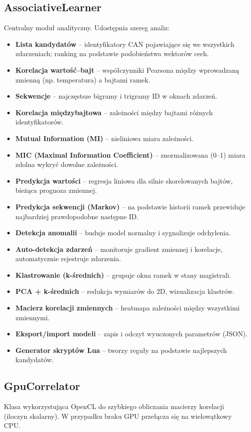 \documentclass[a4paper,12pt,polish]{article}
\begin{document}
\subsection{AssociativeLearner}
Centralny moduł analityczny. Udostępnia szereg analiz:
\begin{itemize}[noitemsep]
  \item \textbf{Lista kandydatów} – identyfikatory CAN pojawiające się we wszystkich zdarzeniach; ranking na podstawie podobieństwa wektorów cech.
  \item \textbf{Korelacja wartość--bajt} – współczynniki Pearsona między wprowadzaną zmienną (np. temperatura) a bajtami ramek.
  \item \textbf{Sekwencje} – najczęstsze bigramy i trigramy ID w oknach zdarzeń.
  \item \textbf{Korelacja międzybajtowa} – zależności między bajtami różnych identyfikatorów.
  \item \textbf{Mutual Information (MI)} – nieliniowa miara zależności.
  \item \textbf{MIC (Maximal Information Coefficient)} – znormalizowana (0–1) miara zdolna wykryć dowolne zależności.
  \item \textbf{Predykcja wartości} – regresja liniowa dla silnie skorelowanych bajtów, bieżąca prognoza zmiennej.
  \item \textbf{Predykcja sekwencji (Markov)} – na podstawie historii ramek przewiduje najbardziej prawdopodobne następne ID.
  \item \textbf{Detekcja anomalii} – buduje model normalny i sygnalizuje odchylenia.
  \item \textbf{Auto-detekcja zdarzeń} – monitoruje gradient zmiennej i korelacje, automatycznie rejestruje zdarzenia.
  \item \textbf{Klastrowanie (k-średnich)} – grupuje okna ramek w stany magistrali.
  \item \textbf{PCA + k-średnich} – redukcja wymiarów do 2D, wizualizacja klastrów.
  \item \textbf{Macierz korelacji zmiennych} – heatmapa zależności między wszystkimi zmiennymi.
  \item \textbf{Eksport/import modeli} – zapis i odczyt wyuczonych parametrów (JSON).
  \item \textbf{Generator skryptów Lua} – tworzy reguły na podstawie najlepszych kandydatów.
\end{itemize}

\subsection{GpuCorrelator}
Klasa wykorzystująca OpenCL do szybkiego obliczania macierzy korelacji (iloczyn skalarny). W przypadku braku GPU przełącza się na wielowątkowy CPU.
\end{document}
